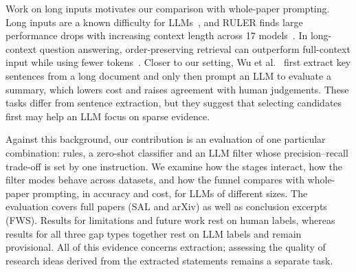 Work on long inputs motivates our comparison with whole-paper prompting. Long inputs are a known difficulty for LLMs~\cite{liu2024lost}, and RULER finds large performance drops with increasing context length across 17 models~\cite{hsieh2024ruler}. In long-context question answering, order-preserving retrieval can outperform full-context input while using fewer tokens~\cite{yu2024defense}. Closer to our setting, Wu et al.~\cite{wu2024lessismore} first extract key sentences from a long document and only then prompt an LLM to evaluate a summary, which lowers cost and raises agreement with human judgements. These tasks differ from sentence extraction, but they suggest that selecting candidates first may help an LLM focus on sparse evidence.

Against this background, our contribution is an evaluation of one particular combination: rules, a zero-shot classifier and an LLM filter whose precision--recall trade-off is set by one instruction. We examine how the stages interact, how the filter modes behave across datasets, and how the funnel compares with whole-paper prompting, in accuracy and cost, for LLMs of different sizes. The evaluation covers full papers (SAL and arXiv) as well as conclusion excerpts (FWS). Results for limitations and future work rest on human labels, whereas results for all three gap types together rest on LLM labels and remain provisional. All of this evidence concerns extraction; assessing the quality of research ideas derived from the extracted statements remains a separate task.

